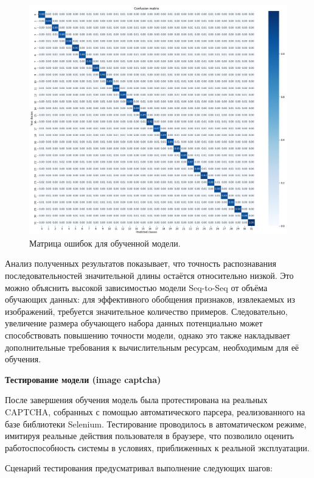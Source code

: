 \begin{figure}[H]
    \centering
    \includegraphics[width=1\linewidth]{imgs/textcaptcha/Confusion_matrix.png}
    \caption{Матрица ошибок для обученной модели.}
    \label{fig:cm}
\end{figure}

Анализ полученных результатов показывает, что точность распознавания 
последовательностей значительной длины остаётся относительно низкой. Это можно 
объяснить высокой зависимостью модели Seq-to-Seq от объёма обучающих данных: для 
эффективного обобщения признаков, извлекаемых из изображений, требуется 
значительное количество примеров. Следовательно, увеличение размера обучающего 
набора данных потенциально может способствовать повышению точности модели, 
однако это также накладывает дополнительные требования к вычислительным ресурсам, 
необходимым для её обучения.

\textbf{Тестирование модели (image captcha)}

После завершения обучения модель была протестирована на реальных CAPTCHA, 
собранных с помощью автоматического парсера, реализованного на базе библиотеки 
Selenium. Тестирование проводилось в автоматическом режиме, имитируя реальные 
действия пользователя в браузере, что позволило оценить работоспособность системы 
в условиях, приближенных к реальной эксплуатации.

Сценарий тестирования предусматривал выполнение следующих шагов:

